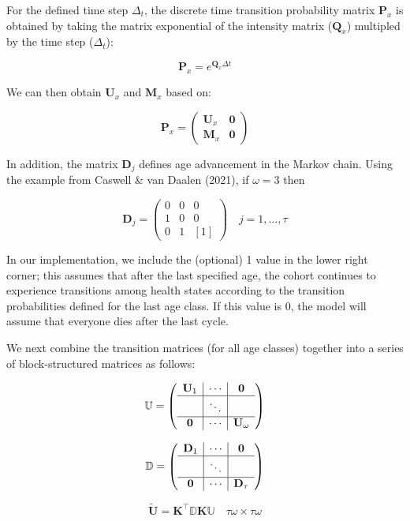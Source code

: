 \documentclass[
]{agujournal2019}
\begin{document}
For the defined time step \(\Delta_t\), the discrete time transition
probability matrix \(\mathbf{P}_x\) is obtained by taking the matrix
exponential of the intensity matrix (\(\mathbf{Q}_x\)) multipled by the
time step (\(\Delta_t\)):

\[
\mathbf{P}_x =e^{\mathbf{Q}_x  \Delta t}
\]

We can then obtain \(\mathbf{U}_x\) and \(\mathbf{M}_x\) based on:

\[
\mathbf{P}_x =\left(\begin{array}{c|c}
\mathbf{U}_x  & \mathbf{0} \\
\hline \mathbf{M}_x  & \mathbf{0}
\end{array}\right)
\]

In addition, the matrix \(\mathbf{D}_j\) defines age advancement in the
Markov chain. Using the example from Caswell \& van Daalen (2021), if
\(\omega=3\) then

\[
\mathbf{D}_j=\left(\begin{array}{ccc}
0 & 0 & 0 \\
1 & 0 & 0 \\
0 & 1 & {[1]}
\end{array}\right) \quad j=1, \ldots, \tau
\]

In our implementation, we include the (optional) 1 value in the lower
right corner; this assumes that after the last specified age, the cohort
continues to experience transitions among health states according to the
transition probabilities defined for the last age class. If this value
is 0, the model will assume that everyone dies after the last cycle.

We next combine the transition matrices (for all age classes) together
into a series of block-structured matrices as follows:

\[
\mathbb{U}=\left(\begin{array}{c|c|c}
\mathbf{U}_1 & \cdots & \mathbf{0} \\
\hline & \ddots & \\
\hline \mathbf{0} & \cdots & \mathbf{U}_\omega
\end{array}\right)
\]

\[
\mathbb{D}=\left(\begin{array}{c|c|c}
\mathbf{D}_1 & \cdots & \mathbf{0} \\
\hline & \ddots & \\
\hline \mathbf{0} & \cdots & \mathbf{D}_\tau
\end{array}\right)
\]

\[
\tilde{\mathbf{U}}=\mathbf{K}^{\top} \mathbb{D} \mathbf{K} \mathbb{U} \quad \tau \omega \times \tau \omega
\]
\end{document}
